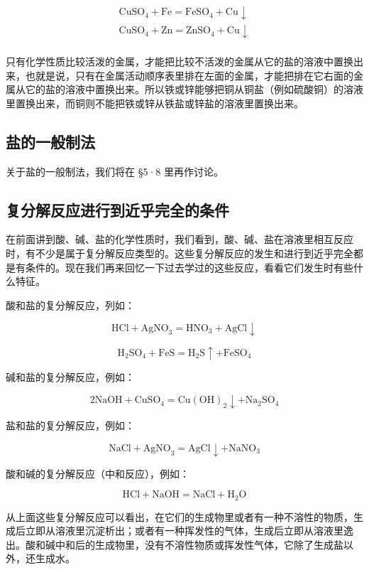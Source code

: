 \[
\begin{array}{l} \mathrm{CuSO}_{4} + \mathrm{Fe} = \mathrm{FeSO}_{4} + \mathrm{Cu} \downarrow \\ \mathrm{CuSO}_{4} + \mathrm{Zn} = \mathrm{ZnSO}_{4} + \mathrm{Cu} \downarrow \\ \end{array}
\]

只有化学性质比较活泼的金属，才能把比较不活泼的金属从它的盐的溶液中置换出来，也就是说，只有在金属活动顺序表里排在左面的金属，才能把排在它右面的金属从它的盐的溶液中置换出来。所以铁或锌能够把铜从铜盐（例如硫酸铜）的溶液里置换出来，而铜则不能把铁或锌从铁盐或锌盐的溶液里置换出来。

\subsection{盐的一般制法}

关于盐的一般制法，我们将在 §5·8 里再作讨论。

\subsection{复分解反应进行到近乎完全的条件}

在前面讲到酸、碱、盐的化学性质时，我们看到，酸、碱、盐在溶液里相互反应时，有不少是属于复分解反应类型的。这些复分解反应的发生和进行到近乎完全都是有条件的。现在我们再来回忆一下过去学过的这些反应，看看它们发生时有些什么特征。

酸和盐的复分解反应，列如：

\[
\mathrm{HCl}+\mathrm{AgNO}_{3}=\mathrm{HNO}_{3}+\mathrm{AgCl}\downarrow
\]

\[
\mathrm{H}_{2} \mathrm{SO}_{4} + \mathrm{FeS} = \mathrm{H}_{2} \mathrm{S} \uparrow + \mathrm{FeSO}_{4}
\]

碱和盐的复分解反应，例如：

\[
2 \mathrm{NaOH} + \mathrm{CuSO}_{4} = \mathrm{Cu(OH)}_{2} \downarrow + \mathrm{Na}_{2} \mathrm{SO}_{4}
\]

盐和盐的复分解反应，例如：

\[
\mathrm{NaCl} + \mathrm{AgNO}_{3} = \mathrm{AgCl} \downarrow + \mathrm{NaNO}_{3}
\]

酸和碱的复分解反应（中和反应），例如：

\[
\mathrm{HCl} + \mathrm{NaOH} = \mathrm{NaCl} + \mathrm{H}_{2} \mathrm{O}
\]

从上面这些复分解反应可以看出，在它们的生成物里或者有一种不溶性的物质，生成后立即从溶液里沉淀析出；或者有一种挥发性的气体，生成后立即从溶液里逸出。酸和碱中和后的生成物里，没有不溶性物质或挥发性气体，它除了生成盐以外，还生成水。

